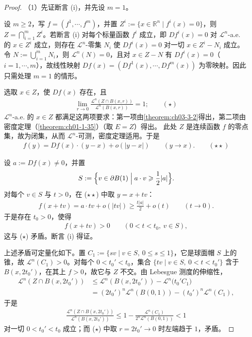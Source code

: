 \documentclass[../../main.tex]{subfiles}%
\begin{document}
\begin{proof}
（1）先证断言 (i)，并先设 $m=1$。

设 $m\geqslant2$，写 $f=(f^1,\cdots,f^m)$，并置 $Z^i:=\{x\in\mathbb{R}^n\mid f^i(x)=0\}$，则 $Z=\bigcap_{i=1}^mZ^i$。若断言 (i) 对每个标量函数 $f^i$ 成立，即 $Df^i(x)=0$ 对 $\mathcal{L}^n$-a.e. 的 $x\in Z^i$ 成立，则存在 $\mathcal{L}^n$-零集 $N_i$ 使 $Df^i(x)=0$ 对一切 $x\in Z^i-N_i$ 成立。令 $N:=\bigcup_{i=1}^mN_i$，则 $\mathcal{L}^n(N)=0$，且对 $x\in Z-N$ 有 $Df^i(x)=0$（$i=1,\cdots,m$），故线性映射 $Df(x)=(Df^1(x),\cdots,Df^m(x))$ 为零映射。因此只需处理 $m=1$ 的情形。

选取 $x\in Z$，使 $Df(x)$ 存在，且
\begin{align*}
\lim_{r\to0}\frac{\mathcal{L}^n(Z\cap B(x,r))}{\mathcal{L}^n(B(x,r))}=1;\qquad(\star)
\end{align*}
$\mathcal{L}^n$-a.e. 的 $x\in Z$ 都满足这两项要求：第一项由\cref{theorem:ch03-3-2}得出，第二项由密度定理（\cref{theorem:ch01-1-35}）（取 $E=Z$）得出。%
此处 $Z$ 是连续函数 $f$ 的零点集，故为闭集，从而 $\mathcal{L}^n$-可测，密度定理适用。于是
\begin{align*}
f(y)=Df(x)\cdot(y-x)+o(\lvert y-x\rvert)\qquad(y\to x).\qquad(\star\star)
\end{align*}

设 $a:=Df(x)\neq0$，并置
\begin{align*}
S:=\Bigl\{v\in\partial B(1)\Bigm| a\cdot v\geqslant\frac12\lvert a\rvert\Bigr\}.
\end{align*}
对每个 $v\in S$ 与 $t>0$，在 ($\star\star$) 中取 $y=x+tv$：
\begin{align*}
f(x+tv)=a\cdot tv+o(\lvert tv\rvert)\geqslant\frac{t\lvert a\rvert}{2}+o(t)\qquad(t\to0).
\end{align*}
于是存在 $t_0>0$，使得
\begin{align*}
f(x+tv)>0\qquad(0<t<t_0,\ v\in S),
\end{align*}
这与 ($\star$) 矛盾。断言 (i) 得证。

上述矛盾可定量化如下。置 $C_1:=\{sv\mid v\in S,\ 0\leqslant s\leqslant1\}$，它是球面帽 $S$ 上的锥，故 $\mathcal{L}^n(C_1)>0$。对每个 $0<t_0'<t_0$，集合 $\{tv\mid v\in S,\ 0<t<t_0'\}$ 含于 $B(x,2t_0')$，在其上 $f>0$，故它与 $Z$ 不交。由 Lebesgue 测度的伸缩性，
\begin{align*}
\mathcal{L}^n(Z\cap B(x,2t_0'))
&\leqslant\mathcal{L}^n(B(x,2t_0'))-\mathcal{L}^n\bigl(t_0'C_1\bigr)\\
&=(2t_0')^n\mathcal{L}^n(B(0,1))-(t_0')^n\mathcal{L}^n(C_1),
\end{align*}
于是
\begin{align*}
\frac{\mathcal{L}^n(Z\cap B(x,2t_0'))}{\mathcal{L}^n(B(x,2t_0'))}
\leqslant1-\frac{\mathcal{L}^n(C_1)}{2^n\mathcal{L}^n(B(0,1))}<1
\end{align*}
对一切 $0<t_0'<t_0$ 成立；而 ($\star$) 中取 $r=2t_0'\to0$ 时左端趋于 $1$，矛盾。


\end{proof}
\end{document}
